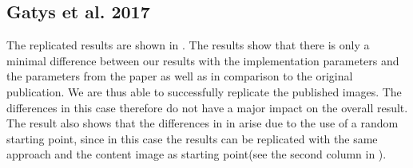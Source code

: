 \subsection{Gatys et al. 2017} \label{sec:Gatys2results}

The replicated results are shown in . The results show that there is only a minimal difference between our results with the implementation parameters and the parameters from the paper as well as in comparison to the original publication. We are thus able to successfully replicate the published images. The differences in this case therefore do not have a major impact on the overall result. The result also shows that the differences in in  arise due to the use of a random starting point, since in this case the results can be replicated with the same approach and the content image as starting point(see the second column in ).

